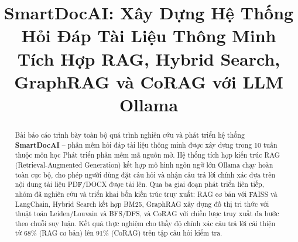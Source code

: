 \documentclass[10pt, conference, a4paper, compsocconf]{IEEEtran}
\begin{document}
\fontsize{10}{12}\selectfont


\title{SmartDocAI: Xây Dựng Hệ Thống Hỏi Đáp Tài Liệu Thông Minh\\
  Tích Hợp RAG, Hybrid Search, GraphRAG và CoRAG với LLM Ollama}

\author{
}

\maketitle

\begin{abstract}
Bài báo cáo trình bày toàn bộ quá trình nghiên cứu và phát triển hệ thống
\textbf{SmartDocAI} -- phần mềm hỏi đáp tài liệu thông minh được xây dựng
trong 10 tuần thuộc môn học Phát triển phần mềm mã nguồn mở. Hệ thống tích
hợp kiến trúc RAG (Retrieval-Augmented Generation) kết hợp mô hình ngôn ngữ
lớn Ollama chạy hoàn toàn cục bộ, cho phép người dùng đặt câu hỏi và nhận
câu trả lời chính xác dựa trên nội dung tài liệu PDF/DOCX được tải lên. Qua
ba giai đoạn phát triển liên tiếp, nhóm đã nghiên cứu và triển khai bốn
kiến trúc truy xuất: RAG cơ bản với FAISS và LangChain, Hybrid Search kết
hợp BM25, GraphRAG xây dựng đồ thị tri thức với thuật toán Leiden/Louvain
và BFS/DFS, và CoRAG với chiến lược truy xuất đa bước theo chuỗi suy luận.
Kết quả thực nghiệm cho thấy độ chính xác câu trả lời cải thiện từ 68\%
(RAG cơ bản) lên 91\% (CoRAG) trên tập câu hỏi kiểm tra.
\end{abstract}
\end{document}
